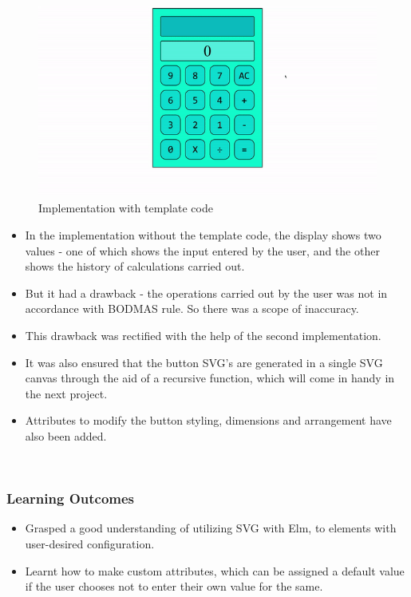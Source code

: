 \begin{FlushLeft}
\begin{figure}[h]
    \centering
    \includegraphics[width=5in]{imgs/elm-calci-2.png}
    \caption{Implementation with template code}
\end{figure}


\begin{itemize}
    \item In the implementation without the template code, the display shows two values - one of which shows the input entered by the user, and the other shows the history of calculations carried out. 
    \item But it had a drawback - the operations carried out by the user was not in accordance with BODMAS rule. So there was a scope of inaccuracy. 
    \item This drawback was rectified with the help of the second implementation. 
    \item It was also ensured that the button SVG's are generated in a single SVG canvas through the aid of a recursive function, which will come in handy in the next project.
    \item Attributes to modify the button styling, dimensions and arrangement have also been added. 
\end{itemize}

\\[0.5in]

\subsubsection{Learning Outcomes}
\begin{itemize}
    \item Grasped a good understanding of utilizing SVG with Elm, to elements with user-desired configuration. \item Learnt how to make custom attributes, which can be assigned a default value if the user chooses not to enter their own value for the same.  
\end{itemize}
\\[0.5in]


\end{FlushLeft}
